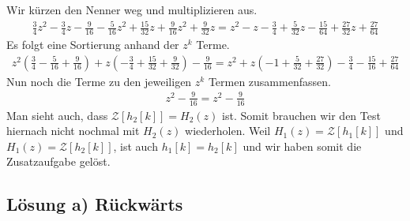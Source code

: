 \documentclass[11pt,a4paper,DIV=12]{scrartcl}
\begin{document}
%
%
Wir kürzen den Nenner weg und multiplizieren aus.
%
%
\begin{gather}
	\frac{3}{4}z^2-\frac{3}{4}z-\frac{9}{16}-\frac{5}{16}z^2+\frac{15}{32}z+\frac{9}{16}z^2+\frac{9}{32}z
	=z^2-z-\frac{3}{4}+\frac{5}{32}z-\frac{15}{64}+\frac{27}{32}z+\frac{27}{64}
\end{gather}
%
%
Es folgt eine Sortierung anhand der $z^k$ Terme.
%
%
\begin{gather}
	z^2(\frac{3}{4}-\frac{5}{16}+\frac{9}{16})+z(-\frac{3}{4}+\frac{15}{32}+\frac{9}{32})-\frac{9}{16}
	=z^2+z(-1+\frac{5}{32}+\frac{27}{32})-\frac{3}{4}-\frac{15}{16}+\frac{27}{64}
\end{gather}
%
%
Nun noch die Terme zu den jeweiligen $z^k$ Termen zusammenfassen.
%
\begin{gather}
	z^2-\frac{9}{16}=z^2-\frac{9}{16}
\end{gather}
%
Man sieht auch, dass $\mathcal{Z}\left[h_2[k]\right]=H_2(z)$ ist. 
%
Somit brauchen wir den Test hiernach nicht nochmal mit $H_2(z)$ wiederholen. 
%
Weil $H_1(z)=\mathcal{Z}\left[h_1[k]\right]$ und 
$H_1(z)=\mathcal{Z}\left[h_2[k]\right]$, ist auch $h_1[k]=h_2[k]$ und wir haben
somit die Zusatzaufgabe gelöst.\\
%
\newpage
\subsection*{Lösung a) Rückwärts}
\end{document}
